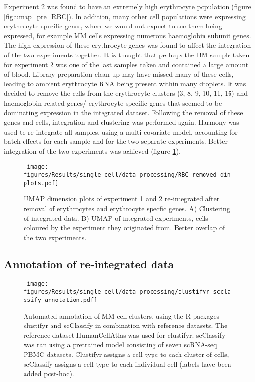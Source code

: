 Experiment 2 was found to have an extremely high erythrocyte population (figure \ref{fig:umap_pre_RBC}).
In addition, many other cell populations were expressing erythrocyte specific genes, where we would not expect to see them being expressed, for example MM cells expressing numerous haemoglobin subunit genes.
The high expression of these erythrocyte genes was found to affect the integration of the two experiments together.
It is thought that perhaps the BM sample taken for experiment 2 was one of the last samples taken and contained a large amount of blood.
Library preparation clean-up may have missed many of these cells, leading to ambient erythrocyte RNA being present within many droplets.
It was decided to remove the cells from the erythrocyte clusters (3, 8, 9, 10, 11, 16) and haemoglobin related genes/ erythrocyte specific genes that seemed to be dominating expression in the integrated dataset.
Following the removal of these genes and cells, integration and clustering was performed again.
Harmony was used to re-integrate all samples, using a multi-covariate model, accounting for batch effects for each sample and for the two separate experiments.
Better integration of the two experiments was achieved (figure \ref{fig:umap_post_RBC}).


\begin{figure}[htb]
    \centering
    \texttt{[image: figures/Results/single\_cell/data\_processing/RBC\_removed\_dimplots.pdf]}
    \caption[Integrated experiments post-erythrocyte removal]{UMAP dimension plots of experiment 1 and 2 re-integrated after removal of erythrocytes and erythrocyte specfic genes.
    A) Clustering of integrated data.
    B) UMAP of integrated experiments, cells coloured by the experiment they originated from.
    Better overlap of the two experiments. }
    \label{fig:umap_post_RBC}
\end{figure}

\subsection{Annotation of re-integrated data}

\begin{figure}[htb]
    \centering
    \texttt{[image: figures/Results/single\_cell/data\_processing/clustifyr\_scclassify\_annotation.pdf]}
    \caption[Automated annotation of scRNA-seq data]{Automated annotation of MM cell clusters, using the R packages clustifyr and scClassify in combination with reference datasets.
    The reference dataset HumanCellAtlas was used for clustifyr.
    scClassify was ran using a pretrained model consisting of seven scRNA-seq PBMC datasets.
    Clustifyr assigns a cell type to each cluster of cells, scClassify assigns a cell type to each individual cell (labels have been added post-hoc). }
    \label{fig:annotation_automated}
\end{figure}

